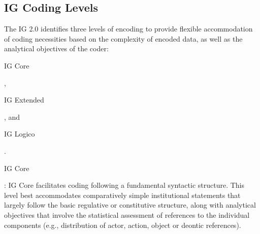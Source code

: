 %
%
%
%
%
%


\newpage

\subsection{IG Coding Levels}
\label{subsec:IgCodingLevels}

The IG 2.0 identifies three levels of encoding to provide flexible accommodation of coding necessities based on the complexity of encoded data, as well as the analytical objectives of the coder: \begin{hil}IG Core\end{hil}, \begin{hil}IG Extended\end{hil}, and \begin{hil}IG Logico\end{hil}.

\begin{hil}IG Core\end{hil}: IG Core facilitates coding following a fundamental syntactic structure. This level best accommodates comparatively simple institutional statements that largely follow the basic regulative or constitutive structure, along with analytical objectives that involve the statistical assessment of references to the individual components (e.g., distribution of actor, action, object or deontic references).


